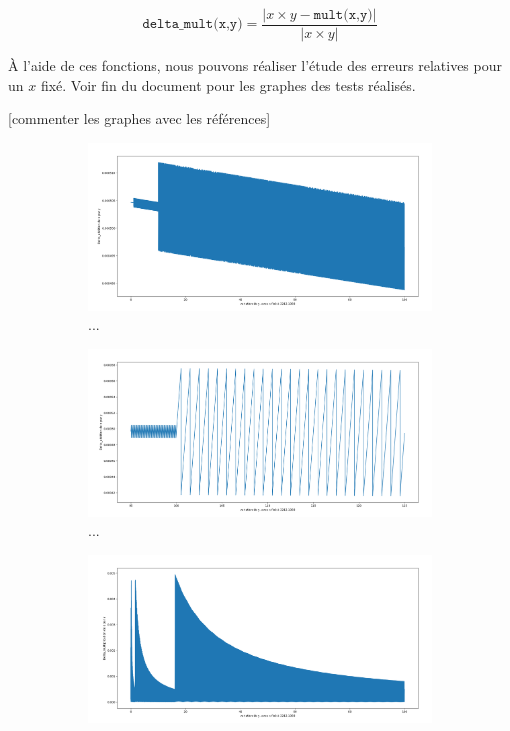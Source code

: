 \documentclass{article}
\begin{document}
\begin{equation}
  \texttt{delta\_mult(x,y)} = \dfrac{\big\vert x \times y - \texttt{mult(x,y)} \big\vert}{\big\vert x\times y \big\vert}
  \label{eq:delta_mult}
\end{equation}

À l'aide de ces fonctions, nous pouvons réaliser l'étude des erreurs relatives pour un $x$ fixé. Voir fin du document pour les graphes des tests réalisés.

[commenter les graphes avec les références]


\begin{figure}[ht]
  \centering
  \begin{subfigure}[b]{0.5\textwidth}
    \centering
    \includegraphics[width=\linewidth]{Partie1-delta_add_0-100.png}
    \caption{...}
    \label{fig:delta_add_big}
  \end{subfigure}
  \hfill
  \begin{subfigure}[b]{0.5\textwidth}
    \centering
    \includegraphics[width=\linewidth]{Partie1-delta_add_95-125.png}
    \caption{...}
    \label{fig:delta_add_zoom}
  \end{subfigure}
  \begin{subfigure}[b]{0.5\textwidth}
    \centering
      \includegraphics[width=\linewidth]{Partie1-delta_mult_0-100.png}

\end{subfigure}
\end{figure}
\end{document}
